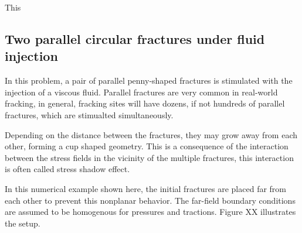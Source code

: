 This

%       
%       

%       
%       

\subsection{Two parallel circular fractures under fluid injection}

In this problem, a pair of parallel penny-shaped fractures is stimulated with the injection of a viscous fluid. Parallel fractures are very common in real-world fracking, in general, fracking sites will have dozens, if not hundreds of parallel fractures, which are stimualted simultaneously.

Depending on the distance between the fractures, they may grow away from each other, forming a cup shaped geometry. This is a consequence of the interaction between the stress fields in the vicinity of the multiple fractures, this interaction is often called stress shadow effect.

In this numerical example shown here, the initial fractures are placed far from each other to prevent this nonplanar behavior. The far-field boundary conditions are assumed to be homogenous for pressures and tractions. Figure XX illustrates the setup. 

